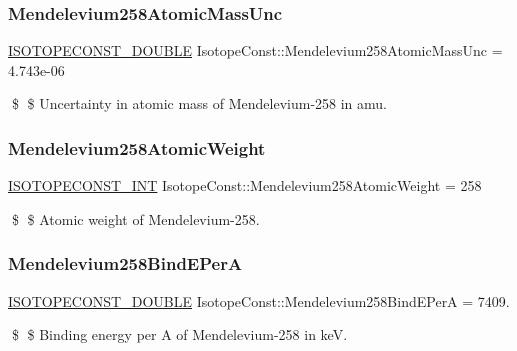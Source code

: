 \subsubsection{\texorpdfstring{Mendelevium258\+Atomic\+Mass\+Unc}{Mendelevium258AtomicMassUnc}}
{\footnotesize\ttfamily \mbox{\hyperlink{group___isotope_const-_macros_ga8f45a7272ce02c0b4c65c44636ed719a}{I\+S\+O\+T\+O\+P\+E\+C\+O\+N\+S\+T\+\_\+\+D\+O\+U\+B\+LE}} Isotope\+Const\+::\+Mendelevium258\+Atomic\+Mass\+Unc = 4.\+743e-\/06}

\$ \$ Uncertainty in atomic mass of Mendelevium-\/258 in amu. \mbox{\label{group___isotope_const-_mendelevium-_md258_ga755f40e58edf7160994e2d4d031517df}} 
\subsubsection{\texorpdfstring{Mendelevium258\+Atomic\+Weight}{Mendelevium258AtomicWeight}}
{\footnotesize\ttfamily \mbox{\hyperlink{group___isotope_const-_macros_ga5f18360b3e99483a35c32d789e62621c}{I\+S\+O\+T\+O\+P\+E\+C\+O\+N\+S\+T\+\_\+\+I\+NT}} Isotope\+Const\+::\+Mendelevium258\+Atomic\+Weight = 258}

\$ \$ Atomic weight of Mendelevium-\/258. \mbox{\label{group___isotope_const-_mendelevium-_md258_gaa7dfa7fd5c16bb67cf95aa6c677b5717}} 
\subsubsection{\texorpdfstring{Mendelevium258\+Bind\+E\+PerA}{Mendelevium258BindEPerA}}
{\footnotesize\ttfamily \mbox{\hyperlink{group___isotope_const-_macros_ga8f45a7272ce02c0b4c65c44636ed719a}{I\+S\+O\+T\+O\+P\+E\+C\+O\+N\+S\+T\+\_\+\+D\+O\+U\+B\+LE}} Isotope\+Const\+::\+Mendelevium258\+Bind\+E\+PerA = 7409.}

\$ \$ Binding energy per A of Mendelevium-\/258 in keV. \mbox{\label{group___isotope_const-_mendelevium-_md258_ga038086618bbd2be8caed86c00f519f1e}} 
